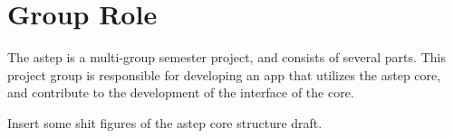 \chapter{Group Role}
The \gls{astep} is a multi-group semester project, and consists of several parts. This project group is responsible for developing an app that utilizes the \gls{astep} core, and contribute to the development of the interface of the core.

Insert some shit figures of the \gls{astep} core structure draft.